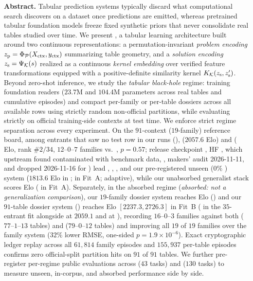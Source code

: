 \begin{bhabstract}
\noindent\textbf{Abstract.}\quad
Tabular prediction systems typically discard what computational search discovers on a dataset once predictions are emitted, whereas pretrained tabular foundation models freeze fixed synthetic priors that never consolidate real tables studied over time. We present \EZ{}, a tabular learning architecture built around two continuous representations: a permutation-invariant \emph{problem encoding} $z_{\mathrm{p}} = \Phi_{\mathcal{P}}(X_{\mathrm{ctx}}, y_{\mathrm{ctx}})$ summarizing table geometry, and a \emph{solution encoding} $z_{\mathrm{s}} = \Psi_{\mathcal{K}}(s)$ realized as a continuous \emph{kernel embedding} over verified feature transformations equipped with a positive-definite similarity kernel $K_{\mathcal{K}}(z_{\mathrm{s}},z_{\mathrm{s}}')$. Beyond zero-shot inference, we study the \emph{tabular black-hole} regime: training foundation readers ($23.7\mathrm{M}$ and $104.4\mathrm{M}$ parameters across \BHRFiveTables{} real tables and \BHTotalDatasetsFed{} cumulative episodes) and compact per-family or per-table dossiers across all available rows using strictly random non-official partitions, while evaluating strictly on official training-side contexts at test time. We enforce strict regime separation across every experiment. On the $91$-context ($19$-family)  reference board, among entrants that saw no  test row in our runs (),  ($2057.6$ Elo) and  (\BHEloLimiXBoard{} Elo, rank $\#2/34$, $12$--$0$--$7$ families vs.\ , $p = 0.57$; release checkpoint , HF , which upstream found contaminated with benchmark data, , makers' audit 2026-11-11, and  dropped 2026-11-16 for ) lead , , , and our pre-registered unseen ($0\%$ ) system ($1813.6$ Elo in ; \BHEloFairReg{} in Fit~A; \BHEloFairAdaptive{} adaptive), while our unabsorbed generalist stack scores \BHEloInCorpus{} Elo (\regincorpus{} in Fit~A). Separately, in the absorbed regime (\emph{absorbed: not a generalization comparison}), our $19$-family dossier system reaches \BHEloRecall{} Elo (\regrecall{}) and our $91$-table dossier system () reaches \BHEloGenTwoA{} Elo $[2237.3, 2726.3]$ in Fit~B (\BHEloGenTwoAJoint{} in the $35$-entrant fit alongside  at $2059.1$ and  at \BHEloLimiXJoint{}), recording $16$--$0$--$3$ families against both  ($77$--$1$--$13$ tables) and  ($79$--$0$--$12$ tables) and improving all $19$ of $19$ families over the family system ($32\%$ lower RMSE, one-sided $p = 1.9\times 10^{-6}$). Exact cryptographic ledger replay across all $61{,}814$ family episodes and $155{,}937$ per-table episodes confirms zero official-split partition hits on $91$ of $91$ tables. We further pre-register per-regime public evaluations across  ($43$ tasks) and  ($130$ tasks) to measure unseen, in-corpus, and absorbed performance side by side.
\end{bhabstract}
